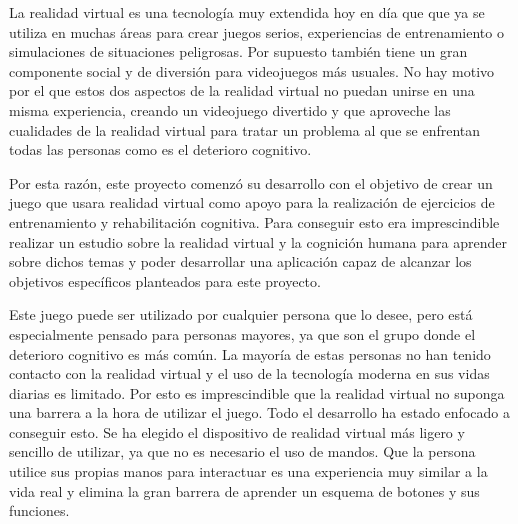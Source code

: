 

\minitoc









La realidad virtual es una tecnología muy extendida hoy en día que que ya se utiliza en muchas áreas para crear juegos serios, experiencias de entrenamiento o simulaciones de situaciones peligrosas. Por supuesto también tiene un gran componente social y de diversión para videojuegos más usuales. No hay motivo por el que estos dos aspectos de la realidad virtual no puedan unirse en una misma experiencia, creando un videojuego divertido y que aproveche las cualidades de la realidad virtual para tratar un problema al que se enfrentan todas las personas como es el deterioro cognitivo.

Por esta razón, este proyecto comenzó su desarrollo con el objetivo de crear un juego que usara realidad virtual como apoyo para la realización de ejercicios de entrenamiento y rehabilitación cognitiva. Para conseguir esto era imprescindible realizar un estudio sobre la realidad virtual y la cognición humana para aprender sobre dichos temas y poder desarrollar una aplicación capaz de alcanzar los objetivos específicos planteados para este proyecto. 

Este juego puede ser utilizado por cualquier persona que lo desee, pero está especialmente pensado para personas mayores, ya que son el grupo donde el deterioro cognitivo es más común. La mayoría de estas personas no han tenido contacto con la realidad virtual y el uso de la tecnología moderna en sus vidas diarias es limitado. Por esto es imprescindible que la realidad virtual no suponga una barrera a la hora de utilizar el juego. Todo el desarrollo ha estado enfocado a conseguir esto. Se ha elegido el dispositivo de realidad virtual más ligero y sencillo de utilizar, ya que no es necesario el uso de mandos. Que la persona utilice sus propias manos para interactuar es una experiencia muy similar a la vida real y elimina la gran barrera de aprender un esquema de botones y sus funciones.

